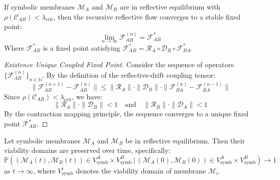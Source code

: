 \begin{lemma}
\label{lemma:bk5_recursive_flow_convergence}
If symbolic membranes $\mathscr{M}_A$ and $\mathscr{M}_B$ are in reflective equilibrium with $\rho(\mathcal{C}_{AB}) < \lambda_{\text{crit}}$, then the recursive reflective flow converges to a stable fixed point:
\begin{equation}
\lim_{n \to \infty} \mathcal{F}_{AB}^{(n)} = \mathcal{F}_{AB}^*
\end{equation}
Where $\mathcal{F}_{AB}^*$ is a fixed point satisfying $\mathcal{F}_{AB}^* = \mathscr{R}_A \circ \mathscr{D}_B \circ \mathcal{F}_{BA}^*$.
\end{lemma}
\begin{proof}[Existence Unique Coupled Fixed Point]
\label{proof:bk5_existence_unique_coupled_fixed_point}
Consider the sequence of operators $\{\mathcal{F}_{AB}^{(n)}\}_{n \in \mathbb{N}}$. By the definition of the reflective-drift coupling tensor:
\begin{equation}
\|\mathcal{F}_{AB}^{(n+1)} - \mathcal{F}_{AB}^{(n)}\| \leq \|\mathscr{R}_A\| \cdot \|\mathscr{D}_B\| \cdot \|\mathcal{F}_{BA}^{(n)} - \mathcal{F}_{BA}^{(n-1)}\|
\end{equation}
Since $\rho(\mathcal{C}_{AB}) < \lambda_{\text{crit}}$, we have:
\begin{equation}
\|\mathscr{R}_A\| \cdot \|\mathscr{D}_B\| < 1 \quad \text{and} \quad \|\mathscr{R}_B\| \cdot \|\mathscr{D}_A\| < 1
\end{equation}
By the contraction mapping principle, the sequence converges to a unique fixed point $\mathcal{F}_{AB}^*$.
\end{proof}
\begin{proposition}
\label{prop:bk5_viability_domain_preservation}
Let symbolic membranes $\mathscr{M}_A$ and $\mathscr{M}_B$ be in reflective equilibrium. Then their viability domains are preserved over time, specifically:
\begin{equation}
\mathbb{P}((\mathscr{M}_A(t), \mathscr{M}_B(t)) \in V_{\text{symb}}^A \times V_{\text{symb}}^B \,|\, (\mathscr{M}_A(0), \mathscr{M}_B(0)) \in V_{\text{symb}}^A \times V_{\text{symb}}^B) \to 1
\end{equation}
as $t \to \infty$, where $V_{\text{symb}}^i$ denotes the viability domain of membrane $\mathscr{M}_i$.
\end{proposition}
